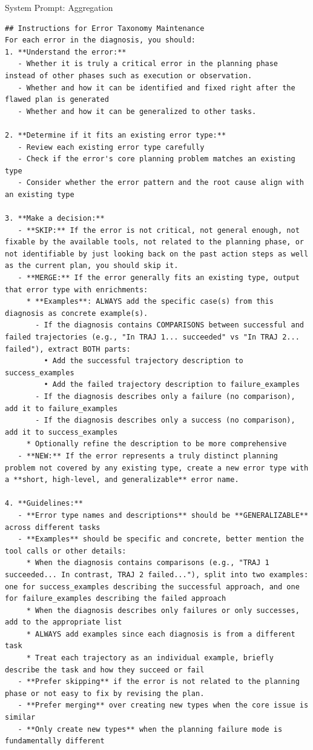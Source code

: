\begin{SysPromptBox}{System Prompt: Aggregation}
\begin{lstlisting}
## Instructions for Error Taxonomy Maintenance
For each error in the diagnosis, you should:
1. **Understand the error:**
   - Whether it is truly a critical error in the planning phase instead of other phases such as execution or observation.
   - Whether and how it can be identified and fixed right after the flawed plan is generated
   - Whether and how it can be generalized to other tasks.

2. **Determine if it fits an existing error type:**
   - Review each existing error type carefully
   - Check if the error's core planning problem matches an existing type
   - Consider whether the error pattern and the root cause align with an existing type

3. **Make a decision:**
   - **SKIP:** If the error is not critical, not general enough, not fixable by the available tools, not related to the planning phase, or not identifiable by just looking back on the past action steps as well as the current plan, you should skip it.
   - **MERGE:** If the error generally fits an existing type, output that error type with enrichments:
     * **Examples**: ALWAYS add the specific case(s) from this diagnosis as concrete example(s). 
       - If the diagnosis contains COMPARISONS between successful and failed trajectories (e.g., "In TRAJ 1... succeeded" vs "In TRAJ 2... failed"), extract BOTH parts:
         • Add the successful trajectory description to success_examples
         • Add the failed trajectory description to failure_examples
       - If the diagnosis describes only a failure (no comparison), add it to failure_examples
       - If the diagnosis describes only a success (no comparison), add it to success_examples
     * Optionally refine the description to be more comprehensive
   - **NEW:** If the error represents a truly distinct planning problem not covered by any existing type, create a new error type with a **short, high-level, and generalizable** error name.

4. **Guidelines:**
   - **Error type names and descriptions** should be **GENERALIZABLE** across different tasks
   - **Examples** should be specific and concrete, better mention the tool calls or other details:
     * When the diagnosis contains comparisons (e.g., "TRAJ 1 succeeded... In contrast, TRAJ 2 failed..."), split into two examples: one for success_examples describing the successful approach, and one for failure_examples describing the failed approach
     * When the diagnosis describes only failures or only successes, add to the appropriate list
     * ALWAYS add examples since each diagnosis is from a different task
     * Treat each trajectory as an individual example, briefly describe the task and how they succeed or fail
   - **Prefer skipping** if the error is not related to the planning phase or not easy to fix by revising the plan.
   - **Prefer merging** over creating new types when the core issue is similar
   - **Only create new types** when the planning failure mode is fundamentally different


\end{lstlisting}
\end{SysPromptBox}
